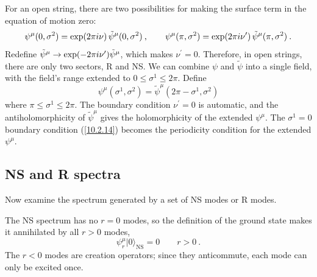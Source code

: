 	For an open string, there are two possibilities for making the surface term in the equation of motion zero:
	\begin{equation}
		\psi^{\mu}(0,\sigma^{2})=\exp(2\pi i\nu)\,\tilde{\psi}^{\mu}(0,\sigma^{2}) \:, \qquad
		\psi^{\mu}(\pi,\sigma^{2})=\exp(2\pi i\nu^{\prime})\,\tilde{\psi}^{\mu}(\pi,\sigma^{2}) \:. \label{10.2.14} 
	\end{equation}
	Redefine $\tilde{\psi}^{\mu}\to\exp(-2\pi i\nu^{\prime})\tilde{\psi}^{\mu}$, which makes $\nu^{\prime}=0$. Therefore, in open strings, there are only two sectors, R and NS. We can combine $\psi$ and $\tilde{\psi}$ into a single field, with the field's range extended to $0\leq\sigma^{1}\leq 2\pi$. Define
	\begin{equation}
		\psi^{\mu}(\sigma^{1},\sigma^{2})=\tilde{\psi}^{\mu}(2\pi-\sigma^{1},\sigma^{2})\label{10.2.15} 
	\end{equation}
	where $\pi\leq\sigma^{1}\leq 2\pi$. The boundary condition $\nu^{\prime}=0$ is automatic, and the antiholomorphicity of $\tilde{\psi}^{\mu}$ gives the holomorphicity of the extended $\psi^{\mu}$. The $\sigma^{1}=0$ boundary condition (\ref{10.2.14}) becomes the periodicity condition for the extended $\psi^{\mu}$.
	
	\subsection*{NS and R spectra}
	Now examine the spectrum generated by a set of NS modes or R modes. 
	
	The NS spectrum has no $r=0$ modes, so the definition of the ground state makes it annihilated by all $r>0$ modes,
	\begin{equation}
		\psi_{r}^{\mu}\lvert 0\rangle_{\text{NS}} =0 \qquad r>0 \:. \label{10.2.16}
	\end{equation}
	The $r<0$ modes are creation operators; since they anticommute, each mode can only be excited once.
	
